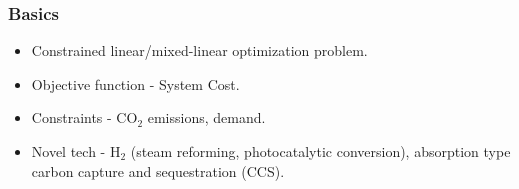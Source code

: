 \begin{frame}
  \frametitle{Basics}
        \begin{itemize}
        
        \item Constrained linear/mixed-linear optimization problem.
        
        \item Objective function - System Cost.
        
        \item Constraints - CO$_2$ emissions, demand.
        
        \item Novel tech - H$_2$ (steam reforming, photocatalytic conversion), absorption type carbon capture and sequestration (CCS).
        
        \end{itemize}
\end{frame}
